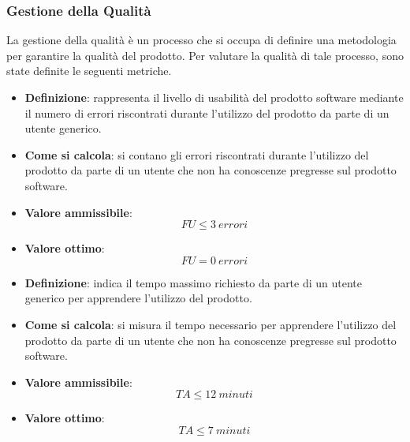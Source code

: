 \subsubsection{Gestione della Qualità}
La gestione della qualità è un processo che si occupa di definire una metodologia per garantire la qualità del prodotto. Per valutare la qualità di tale processo, sono state definite le seguenti metriche.

\hypertarget{21M}{}
\begin{itemize}
	\item \textbf{Definizione}: rappresenta il livello di usabilità del prodotto software mediante il numero di errori riscontrati durante l'utilizzo del prodotto da parte di un utente generico.
	\item \textbf{Come si calcola}: si contano gli errori riscontrati durante l'utilizzo del prodotto da parte di un utente che non ha conoscenze pregresse sul prodotto software.
	\item \textbf{Valore ammissibile}: \begin{equation*}FU \leq 3\ errori\end{equation*}
	\item \textbf{Valore ottimo}: \begin{equation*}FU = 0\ errori\end{equation*}
\end{itemize}

\hypertarget{22M}{}
\begin{itemize}
	\item \textbf{Definizione}: indica il tempo massimo richiesto da parte di un utente generico per apprendere l'utilizzo del prodotto.
	\item \textbf{Come si calcola}: si misura il tempo necessario per apprendere l'utilizzo del prodotto da parte di un utente che non ha conoscenze pregresse sul prodotto software.
	\item \textbf{Valore ammissibile}: \begin{equation*}TA \leq 12\ minuti\end{equation*}
	\item \textbf{Valore ottimo}: \begin{equation*}TA \leq 7\ minuti\end{equation*}
\end{itemize}

